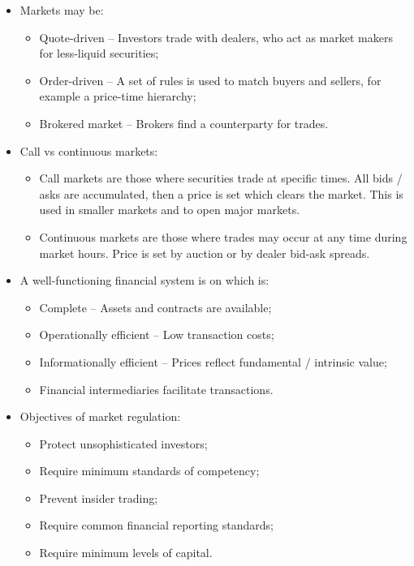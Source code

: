 \documentclass[../notes_compiled.tex]{subfiles}
\begin{document}
\begin{itemize}
\item Markets may be:
\begin{itemize}
\item Quote-driven -- Investors trade with dealers, who act as market makers for less-liquid securities;
\item Order-driven -- A set of rules is used to match buyers and sellers, for example a price-time hierarchy;
\item Brokered market -- Brokers find a counterparty for trades.
\end{itemize}

\item Call vs continuous markets:
\begin{itemize}
\item Call markets are those where securities trade at specific times. All bids / asks are accumulated, then a price is set which clears the market. This is used in smaller markets and to open major markets.
\item Continuous markets are those where trades may occur at any time during market hours. Price is set by auction or by dealer bid-ask spreads.
\end{itemize}

\item A well-functioning financial system is on which is:
\begin{itemize}
\item Complete -- Assets and contracts are available;
\item Operationally efficient -- Low transaction costs;
\item Informationally efficient -- Prices reflect fundamental / intrinsic value;
\item Financial intermediaries facilitate transactions.
\end{itemize}

\item Objectives of market regulation:
\begin{itemize}
\item Protect unsophisticated investors;
\item Require minimum standards of competency;
\item Prevent insider trading;
\item Require common financial reporting standards;
\item Require minimum levels of capital.
\end{itemize}



\end{itemize}
\end{document}
